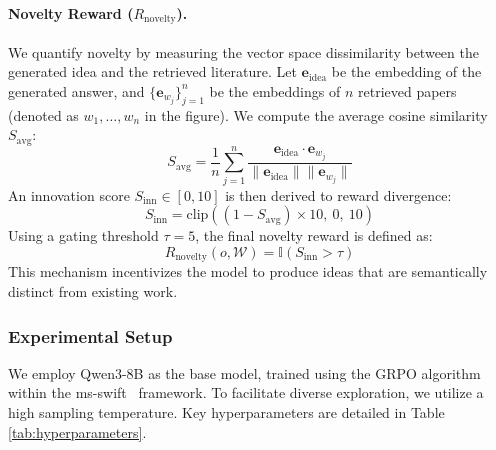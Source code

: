 \paragraph{Novelty Reward ($R_{\text{novelty}}$).} 
We quantify novelty by measuring the vector space dissimilarity between the generated idea and the retrieved literature. Let $\mathbf{e}_{\text{idea}}$ be the embedding of the generated answer, and $\{\mathbf{e}_{w_j}\}_{j=1}^n$ be the embeddings of $n$ retrieved papers (denoted as $w_1, \dots, w_n$ in the figure). We compute the average cosine similarity $S_{\text{avg}}$:
\begin{equation}
    S_{\text{avg}} = \frac{1}{n} \sum_{j=1}^n \frac{\mathbf{e}_{\text{idea}} \cdot \mathbf{e}_{w_j}}{\|\mathbf{e}_{\text{idea}}\| \|\mathbf{e}_{w_j}\|}
\end{equation}
An innovation score $S_{\text{inn}} \in [0, 10]$ is then derived to reward divergence:
\begin{equation}
    S_{\text{inn}} = \text{clip}\left( (1 - S_{\text{avg}}) \times 10, \ 0, \ 10 \right)
\end{equation}
Using a gating threshold $\tau=5$, the final novelty reward is defined as:
\begin{equation}
    R_{\text{novelty}}(o, \mathcal{W}) = \mathbb{I}(S_{\text{inn}} > \tau)
\end{equation}
This mechanism incentivizes the model to produce ideas that are semantically distinct from existing work.

\subsubsection{Experimental Setup}

We employ Qwen3-8B as the base model, trained using the GRPO algorithm within the ms-swift~\cite{zhao2025swiftascalablelightweightinfrastructure} framework. To facilitate diverse exploration, we utilize a high sampling temperature. Key hyperparameters are detailed in Table \ref{tab:hyperparameters}.


